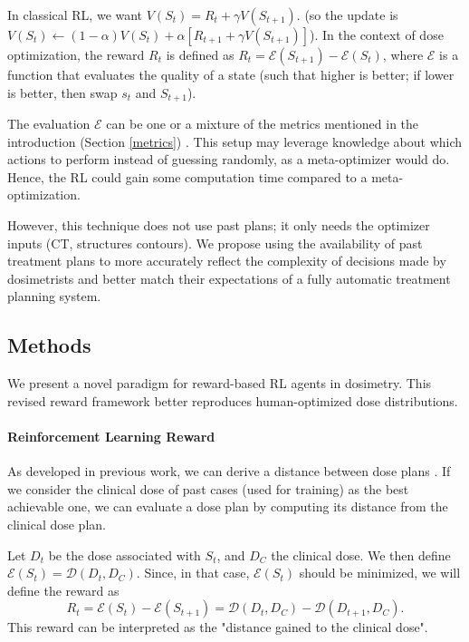 In classical RL, we want $V(S_t) = R_t + \gamma V(S_{t+1})$.
(so the update is $V(S_t) \leftarrow (1-\alpha) V(S_t) + \alpha \left[ R_{t+1} + \gamma V(S_{t+1}) \right]$).
In the context of dose optimization, the reward $R_t$ is defined as $R_t = \mathcal{E}(S_{t+1}) - \mathcal{E}(S_t)$, where $\mathcal{E}$ is a function that evaluates the quality of a state (such that higher is better; if lower is better, then swap $s_t$ and $S_{t+1}$).

The evaluation $\mathcal{E}$ can be one or a mixture of the metrics mentioned in the introduction (Section \ref{metrics}) \cite{shen_hierarchical_2021} \cite{shen_intelligent_2019} \cite{moreau_reinforcement_2021}.
This setup may leverage knowledge about which actions to perform instead of guessing randomly, as a meta-optimizer would do.
Hence, the RL could gain some computation time compared to a meta-optimization.

However, this technique does not use past plans; it only needs the optimizer inputs (CT, structures contours).
We propose using the availability of past treatment plans to more accurately reflect the complexity of decisions made by dosimetrists and better match their expectations of a fully automatic treatment planning system.

\subsection{Methods}
We present a novel paradigm for reward-based RL agents in dosimetry.
This revised reward framework better reproduces human-optimized dose distributions.

\paragraph{Reinforcement Learning Reward}
As developed in previous work, we can derive a distance between dose plans \cite{paul_dubois_novel_2024}.
If we consider the clinical dose of past cases (used for training) as the best achievable one, we can evaluate a dose plan by computing its distance from the clinical dose plan.

Let $D_t$ be the dose associated with $S_t$, and $D_C$ the clinical dose.
We then define $\mathcal{E}(S_t) = \mathcal{D}(D_t, D_C)$.
Since, in that case, $\mathcal{E}(S_t)$ should be minimized, we will define the reward as $$R_t = \mathcal{E}(S_t) - \mathcal{E}(S_{t+1}) = \mathcal{D}(D_t, D_C) - \mathcal{D}(D_{t+1}, D_C).$$
This reward can be interpreted as the "distance gained to the clinical dose". 

